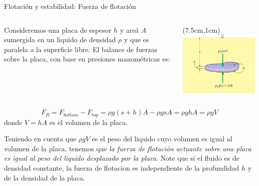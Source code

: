 \documentclass [xcolor=svgnames, t] {beamer}
\begin{document}
\begin{frame}{Flotaci\'on y estabilidad: Fuerza de flotaci\'on}
\begin{columns}
Consideremos una placa de espesor $h$ y are\'a $A$ sumergida en un liquido de densidad $\rho$ y que es paralela a la superficie libre. El balance de fuerzas sobre la placa, con base en presiones manom\'etricas es:

\begin{textblock*}{5cm}(7.5cm,1cm) %
\includegraphics[width=\textwidth]{flota}
\end{textblock*}
\end{columns}
\vspace{1.1cm}
$$
F_B=F_{bottom} - F_{top} = \rho g (s+h)A - \rho gs A = \rho ghA = \rho g V
$$
donde $V=hA$ es el volumen de la placa.\\ 
\begin{block}{}
Teniendo en cuenta que $\rho g V$ es el peso del liquido cuyo volumen es igual al volumen de la placa, tenemos que \emph{la fuerza de flotaci\'on actuante sobre una placa es igual al peso del liquido desplazado por la placa}. Note que si el fluido es de densidad constante, la fuerza de flotacion es independiente de la profundidad $h$ y  de la densidad de la placa. 
\end{block}

\end{frame}
\end{document}
